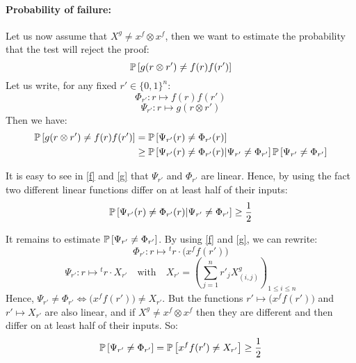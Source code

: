 \paragraph{Probability of failure:} Let us now assume that $X^g\neq x^f\otimes
x^f$, then we want to estimate the probability that the test will reject the
proof:
\begin{displaymath}
\mathbb{P}\left[g(r\otimes r')\neq f(r)f(r')\right]
\end{displaymath}
Let us write, for any fixed $r'\in\{0,1\}^n$:
\begin{displaymath}
\Phi _{r'}:r\mapsto f(r)f(r') 
\end{displaymath}
\begin{displaymath}
\Psi _{r'}:r\mapsto g(r \otimes r')
\end{displaymath}
Then we have:
\begin{equation}\label{main}
\begin{split}
\mathbb{P}\left[g(r\otimes r')\neq f(r)f(r')\right]
&= \mathbb{P}\left[\Psi_{r'}(r)\neq\Phi_{r'}(r)\right]\\
&\geq \mathbb{P}\left[\Psi_{r'}(r)\neq\Phi_{r'}(r)|\Psi_{r'}\neq\Phi_{r'}\right]
\mathbb{P}\left[\Psi_{r'}\neq\Phi_{r'}\right]
\end{split}
\end{equation}

It is easy to see in \eqref{f} and \eqref{g} that $\Psi_{r'}$ and $\Phi_{r'}$
are linear. Hence, by using the fact two different linear functions differ on
at least half of their inputs:
\begin{equation}\label{first}
\mathbb{P}\left[\Psi_{r'}(r)\neq\Phi_{r'}(r)|\Psi_{r'}\neq\Phi_{r'}\right] \geq \frac{1}{2}
\end{equation}

It remains to estimate $\mathbb{P}\left[\Psi_{r'}\neq\Phi_{r'}\right]$. By using \eqref{f} and
\eqref{g}, we can rewrite:
\begin{displaymath}
\Phi_{r'}:r\mapsto{}^tr\cdot \big(x^ff(r')\big)
\end{displaymath}
\begin{displaymath}
\Psi_{r'}:r\mapsto{}^tr\cdot X_{r'}\quad\mathrm{with}\quad
X_{r'} = \left(\sum_{j=1}^n r'_jX^g_{(i,j)}\right)_{1\leq i\leq n}
\end{displaymath}
Hence, $\Psi_{r'}\neq\Phi_{r'}\Leftrightarrow\big(x^ff(r')\big)\neq X_{r'}$.
But the functions $r'\mapsto\big(x^ff(r')\big)$ and $r'\mapsto X_{r'}$ are also
linear, and if $X^g\neq x^f\otimes x^f$ then they are different and then differ
on at least half of their inputs. So:
\begin{equation}\label{second}
\mathbb{P}\left[\Psi_{r'}\neq\Phi_{r'}\right]
=\mathbb{P}\left[x^ff(r')\neq X_{r'}\right]
\geq\frac{1}{2}
\end{equation}

